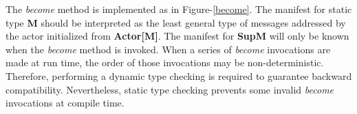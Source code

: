 The {\it become} method is implemented as in Figure-\ref{become}.  The manifest
for static type {\bf M} should be interpreted as the least general type of
messages addressed by the actor initialized from {\bf Actor[M]}.  The
manifest for {\bf SupM} will only be known when the {\it become} method is
invoked.  When a series of {\it become} invocations are made at run time, the
order of those invocations may be non-deterministic.  Therefore, performing a
dynamic type checking is required to guarantee backward compatibility.
Nevertheless, static type checking prevents some invalid {\it become}
invocations at compile time.



